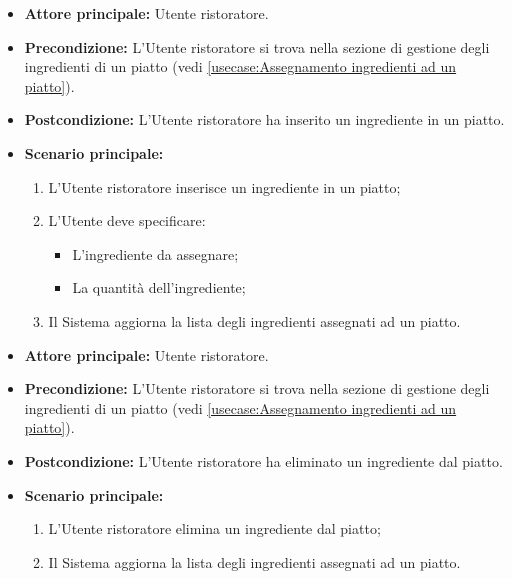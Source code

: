 \label{usecase:Inserimento ingrediente ad un piatto}
\begin{itemize}

	\item \textbf{Attore principale:} Utente ristoratore.

	\item \textbf{Precondizione:} L'Utente ristoratore si trova nella sezione di gestione degli ingredienti di un piatto (vedi \autoref{usecase:Assegnamento ingredienti ad un piatto}).

	\item \textbf{Postcondizione:} L'Utente ristoratore ha inserito un
		ingrediente in un piatto.

	\item \textbf{Scenario principale:}
	\begin{enumerate}
		\item L'Utente ristoratore inserisce un ingrediente in un piatto;
		\item L'Utente deve specificare:
			\begin{itemize}
				\item L'ingrediente da assegnare;
				\item La quantità dell'ingrediente;
			\end{itemize}
		\item Il Sistema aggiorna la lista degli ingredienti assegnati ad un piatto.
	\end{enumerate}
\end{itemize}

\label{usecase:Eliminazione ingrediente da un piatto}
\begin{itemize}

	\item \textbf{Attore principale:} Utente ristoratore.

	\item \textbf{Precondizione:} L'Utente ristoratore si trova nella sezione di gestione degli ingredienti di un piatto (vedi \autoref{usecase:Assegnamento ingredienti ad un piatto}).

	\item \textbf{Postcondizione:} L'Utente ristoratore ha eliminato un
		ingrediente dal piatto.

	\item \textbf{Scenario principale:}
	\begin{enumerate}
		\item L'Utente ristoratore elimina un ingrediente dal piatto;
		\item Il Sistema aggiorna la lista degli ingredienti assegnati ad un piatto.
	\end{enumerate}
\end{itemize}

